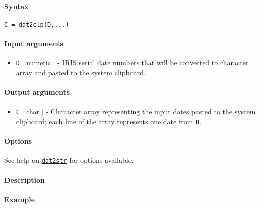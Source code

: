 


	\paragraph{Syntax}

\begin{verbatim}
C = dat2clp(D,...)
\end{verbatim}

\paragraph{Input arguments}

\begin{itemize}
\itemsep1pt\parskip0pt
\item
  \texttt{D} {[} numeric {]} - IRIS serial date numbers that will be
  converted to character array and pasted to the system clipboard.
\end{itemize}

\paragraph{Output arguments}

\begin{itemize}
\itemsep1pt\parskip0pt
\item
  \texttt{C} {[} char {]} - Character array representing the input dates
  pasted to the system clipboard; each line of the array represents one
  date from \texttt{D}.
\end{itemize}

\paragraph{Options}

See help on \href{dates/dat2str}{\texttt{dat2str}} for options
available.

\paragraph{Description}

\paragraph{Example}


